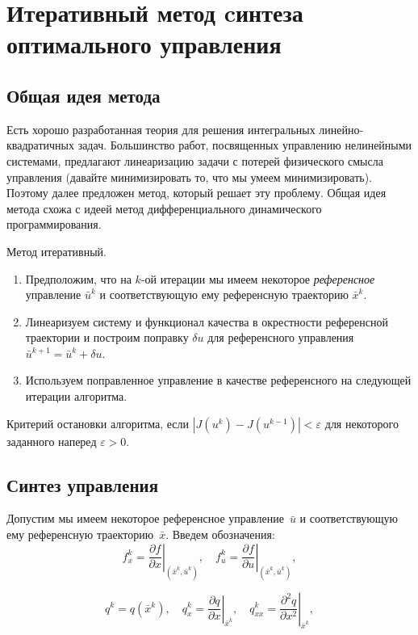 \section{Итеративный метод cинтеза оптимального управления}

\subsection{Общая идея метода}

Есть хорошо разработанная теория для решения интегральных линейно-квадратичных задач.
Большинство работ, посвященных управлению нелинейными системами, предлагают линеаризацию задачи с потерей физического смысла управления (давайте минимизировать то, что мы умеем минимизировать).
Поэтому далее предложен метод, который решает эту проблему.
Общая идея метода схожа с идеей метод дифференциального динамического программирования.

Метод итеративный.
\begin{enumerate}
    \item Предположим, что на $k$-ой итерации мы имеем некоторое \textit{референсное} управление $\bar{u}^k$ и соответствующую ему референсную траекторию $\bar{x}^k$.
    \item Линеаризуем систему и функционал качества в окрестности референсной траектории и построим поправку $\delta u$ для референсного управления $\bar{u}^{k+1} = \bar{u}^k + \delta u$.
    \item Используем поправленное управление в качестве референсного на следующей итерации алгоритма.
\end{enumerate}
Критерий остановки алгоритма, если $|J(u^k) - J(u^{k-1})| < \varepsilon$ для некоторого заданного наперед $\varepsilon > 0$.


\subsection{Синтез управления}
Допустим мы имеем некоторое референсное управление~$\bar u$ и соответствующую ему референсную траекторию~$\bar x$.
Введем обозначения:
$$
    f_x^k = \left.\frac{\partial f}{\partial x}\right|_{(\bar x^k, \bar u^k)},
    \quad
    f_u^k = \left.\frac{\partial f}{\partial u}\right|_{(\bar x^k, \bar u^k)},
$$

$$
    q^k = q(\bar x^k),
    \quad
    q_x^k = \left.\frac{\partial q}{\partial x}\right|_{\bar x^k},
    \quad
    q_{xx}^k = \left.\frac{\partial^2 q}{\partial x^2}\right|_{\bar x^k},
$$

